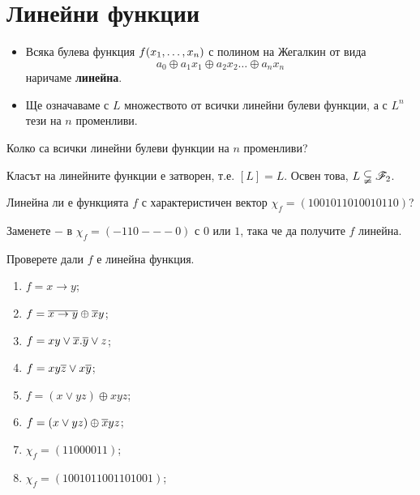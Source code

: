 \section{Линейни функции}

\begin{itemize}
\item 
  Всяка булева функция $f(x_{1},\dots,x_{n})$ с полином на Жегалкин от вида 
  \[a_0\oplus a_1x_1 \oplus a_2x_2 \dots\oplus a_nx_n\] наричаме {\bf линейна}.
\item
  Ще означаваме с $L$ множеството от всички линейни булеви функции, а с $L^n$ тези на $n$ променливи.
\end{itemize}

\begin{problem}
  Колко са всички линейни булеви функции на $n$ променливи?
\end{problem}


\begin{prop}
  Класът на линейните функции е затворен, т.е. $[L] = L$.
  Освен това, $L \subsetneqq \mathscr{F}_2$.
\end{prop}


\begin{problem}
  Линейна ли е функцията $f$ с характеристичен вектор $\chi_f = (1001011010010110)$?
\end{problem}

\begin{problem}
  Заменете $-$ в $\chi_f = (-110---0)$ с $0$ или $1$, така че да получите $f$ линейна.
\end{problem}


\begin{problem}
  Проверете дали $f$ е линейна функция.
  \begin{enumerate}
  \item
    $f = x\rightarrow y$;
  \item
    $f = \overline{x\rightarrow y}\oplus \overline{x}y$;
  \item
    $f = xy\vee \overline{x}.\overline{y}\vee z$;
  \item
    $f = xy\overline{z}\vee x\overline{y}$;
  \item
    $f = (x\vee yz)\oplus xyz$;
  \item
    $f = (x\vee yz)\oplus \overline{x}yz$;
  \item
    $\chi_f = (1100 0011)$;
  \item
    $\chi_f = (1001 0110 0110 1001)$;
  \end{enumerate}
\end{problem}

